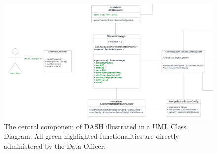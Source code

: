 \begin{figure}[ht]
   \begin{adjustbox}{center}
      \includegraphics[width=0.85\pdfpagewidth]{img/Stream_Manager.pdf}
      \end{adjustbox}
      \caption{The central component of DASH illustrated in a UML Class Diagram. All green highlighted functionalities are directly administered by the Data Officer.\label{fig:stream_manager}}
\end{figure}

